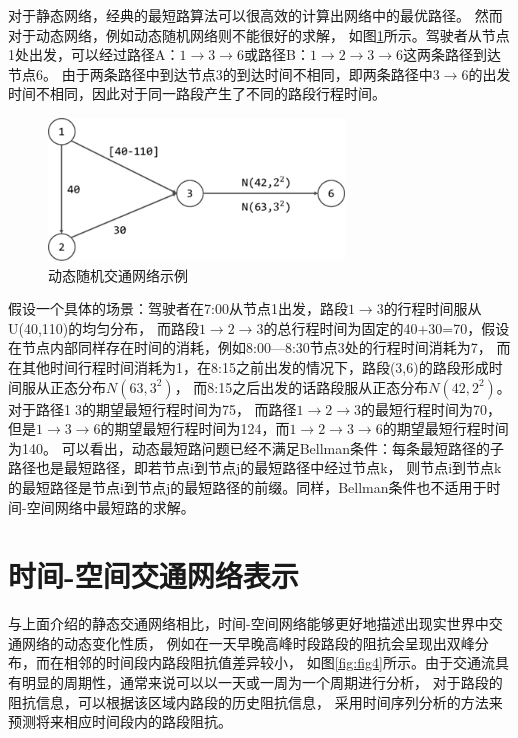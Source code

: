 对于静态网络，经典的最短路算法可以很高效的计算出网络中的最优路径。
然而对于动态网络，例如动态随机网络则不能很好的求解，
如图\ref{fig:fig3}所示。驾驶者从节点1处出发，可以经过路径A：$1 \to 3 \to 6$或路径B：$1\to 2\to 3\to 6$这两条路径到达节点6。
由于两条路径中到达节点3的到达时间不相同，即两条路径中$3\to 6$的出发时间不相同，因此对于同一路段产生了不同的路段行程时间。
\begin{figure}[H] %
    \centering %
    \includegraphics[width=0.7\textwidth]{png/图片3 动态随机网络} %
    \caption{动态随机交通网络示例} %
    \label{fig:fig3} %
\end{figure}

假设一个具体的场景：驾驶者在7:00从节点1出发，路段$1 \to 3$的行程时间服从U(40,110)的均匀分布，
而路段$1\to 2\to 3$的总行程时间为固定的40+30=70，假设在节点内部同样存在时间的消耗，例如8:00---8:30节点3处的行程时间消耗为7，
而在其他时间行程时间消耗为1，在8:15之前出发的情况下，路段(3,6)的路段形成时间服从正态分布$N(63,3^2)$，
而8:15之后出发的话路段服从正态分布$N(42,2^2)$。对于路径13的期望最短行程时间为75，
而路径$1\to 2\to 3$的最短行程时间为70，但是$1\to 3\to 6$的期望最短行程时间为124，而$1\to 2\to 3\to 6$的期望最短行程时间为140。
可以看出，动态最短路问题已经不满足Bellman条件：每条最短路径的子路径也是最短路径，即若节点i到节点j的最短路径中经过节点k，
则节点i到节点k的最短路径是节点i到节点j的最短路径的前缀。同样，Bellman条件也不适用于时间-空间网络中最短路的求解。


\section{时间-空间交通网络表示}\label{sec:时间-空间交通网络表示}
与上面介绍的静态交通网络相比，时间-空间网络能够更好地描述出现实世界中交通网络的动态变化性质，
例如在一天早晚高峰时段路段的阻抗会呈现出双峰分布，而在相邻的时间段内路段阻抗值差异较小，
如图\ref{fig:fig4}所示。由于交通流具有明显的周期性，通常来说可以以一天或一周为一个周期进行分析，
对于路段的阻抗信息，可以根据该区域内路段的历史阻抗信息，
采用时间序列分析的方法来预测将来相应时间段内的路段阻抗。

